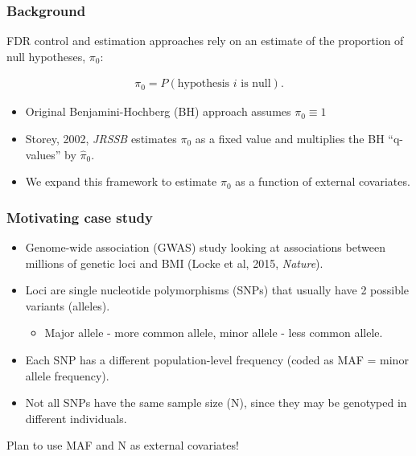 \documentclass{beamer}
\begin{document}

\begin{frame}
\frametitle{Background}

FDR control and estimation approaches rely on an estimate of the proportion of null hypotheses, $\pi_0$:

\begin{eqnarray*}
\pi_0 = P(\mbox{hypothesis $i$ is null}).
\end{eqnarray*}

\begin{itemize}
\item Original Benjamini-Hochberg (BH) approach assumes $\pi_0 \equiv 1$
\item Storey, 2002, \textit{JRSSB} estimates $\pi_0$ as a fixed value and multiplies the BH ``q-values'' by $\hat{\pi}_0$.
\item We expand this framework to estimate $\pi_0$ as a function of external covariates.
\end{itemize}


\end{frame}


\begin{frame}
\frametitle{Motivating case study}

\begin{itemize}
\item Genome-wide association ({\color{red}GWAS}) study looking at associations between millions of genetic loci and BMI (Locke et al, 2015, \textit{Nature}).
\item Loci are single nucleotide polymorphisms (SNPs) that usually have 2 possible variants (alleles).
\begin{itemize}
\item Major allele - more common allele, minor allele - less common allele.
\end{itemize}
\item Each SNP has a different population-level frequency (coded as {\color{red}MAF = minor allele frequency}).
\item Not all SNPs have the same sample size ({\color{red}N}), since they may be genotyped in different individuals.
\end{itemize}

\vspace{0.5cm}Plan to use MAF and N as external covariates!

\end{frame}
\end{document}
